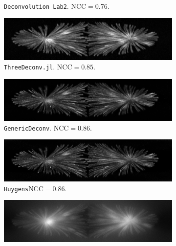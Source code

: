 \documentclass{juliacon}
\begin{document}
\begin{figure}[h]
\begin{subfigure}{.3\textwidth}
                \caption{\texttt{Deconvolution Lab2}. $\text{NCC}= 0.76$.}
            \end{subfigure}
            \begin{subfigure}{.3\textwidth}
                \centering
                \includegraphics[width=\textwidth]{figures/MIPs/mip_ThreeDeconv.png}
                \caption{\texttt{ThreeDeconv.jl}. $\text{NCC}= 0.85$.}
            \end{subfigure}
            \begin{subfigure}{.3\textwidth}
                \centering
                \includegraphics[width=\textwidth]{figures/MIPs/mip_GenericDeconv.png}
                \caption{\texttt{GenericDeconv}. $\text{NCC}= 0.86$.}
            \end{subfigure}
            \begin{subfigure}{.3\textwidth}
                \centering
                \includegraphics[width=\textwidth]{figures/MIPs/mip_Huygens.png}
                \caption{\texttt{Huygens}$\text{NCC}= 0.86$.}
            \end{subfigure}
            \begin{subfigure}{.3\textwidth}
                \centering
                \includegraphics[width=\textwidth]{figures/MIPs/mip_raw.png}

\end{subfigure}
\end{figure}
\end{document}
